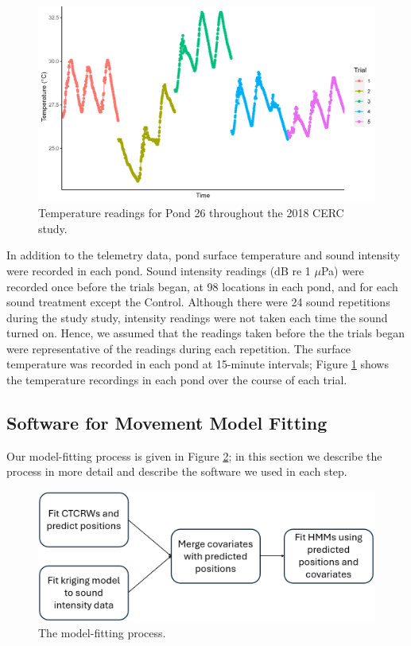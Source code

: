 \documentclass[12pt]{article}
\begin{document}
	\begin{figure}
		\includegraphics[width=\textwidth]{pond_26_temp.png}
		\caption{Temperature readings for Pond 26 throughout the 2018 CERC study.}
		\label{img:temperature}
	\end{figure}
		
	In addition to the telemetry data, pond surface temperature and sound intensity were recorded in each pond. 	
	Sound intensity readings (dB re 1 $\mu$Pa) were recorded once before the trials began, at 98 locations in each pond, and for each sound treatment except the Control. Although there were 24 sound repetitions during the study study, intensity readings were not taken each time the sound turned on. Hence, we assumed that the readings taken before the the trials began were representative of the readings during each repetition. The surface temperature was recorded in each pond at 15-minute intervals; Figure \ref{img:temperature} shows the temperature recordings in each pond over the course of each trial.		
	
	\subsection{Software for Movement Model Fitting}
	
	Our model-fitting process is given in Figure \ref{img:flowchart}; in this section we describe the process in more detail and describe the software we used in each step.
	
	\begin{figure}
		\includegraphics[width=\textwidth]{flowchart.png}
		\caption{The model-fitting process.}
		\label{img:flowchart}
	\end{figure}
		
\end{document}
